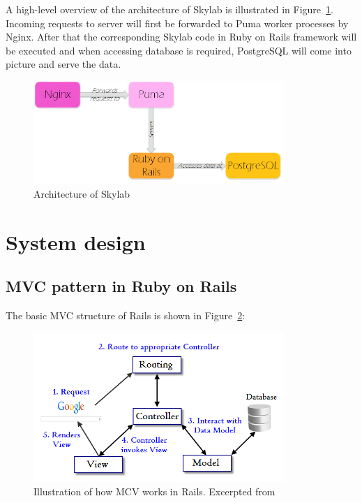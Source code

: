 A high-level overview of the architecture of Skylab is illustrated in Figure~\ref{fig:Skylabarch}. Incoming requests to server will first be forwarded to Puma worker processes by Nginx. After that the corresponding Skylab code in Ruby on Rails framework will be executed and when accessing database is required, PostgreSQL will come into picture and serve the data.

\begin{figure}[h]
  \centering
  \includegraphics[width=0.85\textwidth]{Images/Skylab_Arch.png}
  \caption{Architecture of Skylab}
  \label{fig:Skylabarch}
\end{figure}

\section{System design}

\subsection{MVC pattern in Ruby on Rails}

The basic MVC structure of Rails is shown in Figure~\ref{fig:RailsMVC}:

\begin{figure}[h]
  \centering
  \includegraphics[width=0.85\textwidth]{Images/Rails_MVC.png}
  \caption{Illustration of how MCV works in Rails. Excerpted from \cite{citationMVC}}
  \label{fig:RailsMVC}
\end{figure}

